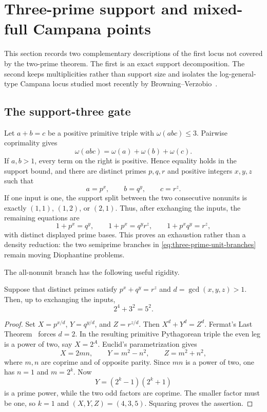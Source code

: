 \section{Three-prime support and mixed-full Campana points}
\label{sec:three-prime-campana}

This section records two complementary descriptions of the first locus not
covered by the two-prime theorem.  The first is an exact support
decomposition.  The second keeps multiplicities rather than support size and
isolates the log-general-type Campana locus studied most recently by
Browning--Verzobio~\cite{BrowningVerzobio2026}.

\subsection{The support-three gate}

Let $a+b=c$ be a positive primitive triple with
$\omega(abc)\leq 3$.  Pairwise coprimality gives
\[
 \omega(abc)=\omega(a)+\omega(b)+\omega(c).
\]
If $a,b>1$, every term on the right is positive.  Hence equality holds in
the support bound, and there are distinct primes $p,q,r$ and positive
integers $x,y,z$ such that
\begin{equation}\label{eq:three-prime-fermat}
                     a=p^x,\qquad b=q^y,\qquad c=r^z.
\end{equation}
If one input is one, the support split between the two consecutive nonunits
is exactly $(1,1)$, $(1,2)$, or $(2,1)$.  Thus, after exchanging the inputs,
the remaining equations are
\begin{equation}\label{eq:three-prime-unit-branches}
 1+p^x=q^y,\qquad 1+p^x=q^yr^z,\qquad
 1+p^xq^y=r^z,
\end{equation}
with distinct displayed prime bases.  This proves an exhaustion rather than
a density reduction: the two semiprime branches in
\eqref{eq:three-prime-unit-branches} remain moving Diophantine problems.

The all-nonunit branch has the following useful rigidity.

\begin{theorem}\label{thm:three-prime-common-exp}
Suppose that distinct primes satisfy
$p^x+q^y=r^z$ and $d=\gcd(x,y,z)>1$.  Then, up to exchanging the inputs,
\[
                         2^4+3^2=5^2.
\]
\end{theorem}

\begin{proof}
Set $X=p^{x/d}$, $Y=q^{y/d}$, and $Z=r^{z/d}$.  Then
$X^d+Y^d=Z^d$.  Fermat's Last Theorem~\cite{Wiles1995,TaylorWiles1995}
forces $d=2$.  In the resulting primitive Pythagorean triple the even leg is
a power of two, say $X=2^A$.  Euclid's parametrization gives
\[
 X=2mn,\qquad Y=m^2-n^2,\qquad Z=m^2+n^2,
\]
where $m,n$ are coprime and of opposite parity.  Since $mn$ is a power of
two, one has $n=1$ and $m=2^k$.  Now
\[
 Y=(2^k-1)(2^k+1)
\]
is a prime power, while the two odd factors are coprime.  The smaller factor
must be one, so $k=1$ and $(X,Y,Z)=(4,3,5)$.  Squaring proves the assertion.
\end{proof}

